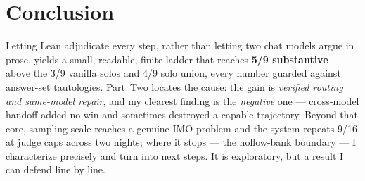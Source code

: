 \section{Conclusion}
\label{sec:conclusion}

Letting Lean adjudicate every step, rather than letting two chat models argue in
prose, yields a small, readable, finite ladder that reaches \textbf{5/9
substantive} --- above the 3/9 vanilla solos and 4/9 solo union, every number
guarded against answer-set tautologies. Part~Two locates the cause: the gain is
\emph{verified routing and same-model repair}, and my clearest finding is the
\emph{negative} one --- cross-model handoff added no win and sometimes destroyed a
capable trajectory. Beyond that core, sampling scale reaches a genuine IMO problem
and the system repeats 9/16 at judge caps across two nights; where it stops --- the
hollow-bank boundary --- I characterize precisely and turn into next steps. It is
exploratory, but a result I can defend line by line.

